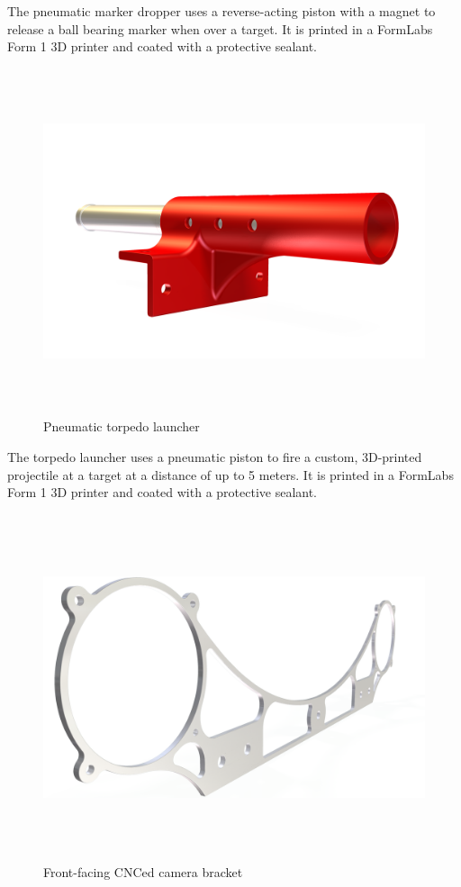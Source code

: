 \documentclass[12pt, landscape]{article}
\begin{document}
The pneumatic marker dropper uses a reverse-acting piston with a magnet to release a ball bearing marker when over a target.  It is printed in a FormLabs Form 1 3D printer and coated with a protective sealant.

\begin{figure}[H]
\centering
\includegraphics[height=4in]{media/TORPEDO-RENDER-ALPHA.png}
\caption{Pneumatic torpedo launcher}
\label{torpedo}
\end{figure}

The torpedo launcher uses a pneumatic piston to fire a custom, 3D-printed projectile at a target at a distance of up to 5 meters.  It is printed in a FormLabs Form 1 3D printer and coated with a protective sealant.

\begin{figure}[H]
\centering
\includegraphics[height=4in]{media/front_camera_bracket.png}
\caption{Front-facing CNCed camera bracket}
\label{camera_bracket}
\end{figure}
\end{document}
